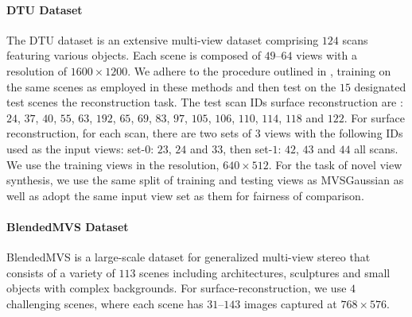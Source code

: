 \paragraph{\textbf{DTU Dataset}} The DTU dataset \cite{aanaes2016large} is an extensive multi-view dataset comprising $124$ scans featuring various objects. Each scene is composed of $49$–$64$ views with a resolution of $1600 \times 1200$. We adhere to the procedure outlined in \cite{long2022sparseneus, ren2023volrecon, liang2024retr}, training on the same scenes as employed in these methods and then test on the $15$ designated test scenes the reconstruction task. The test scan IDs surface reconstruction are : $24$, $37$, $40$, $55$, $63$, $192$, $65$, $69$, $83$, $97$, $105$, $106$, $110$, $114$, $118$ and $122$. For surface reconstruction, for each scan, there are two sets of 3 views with the following IDs used as the input views: set-$0$: $23$, $24$ and $33$, then set-$1$: $42$, $43$ and $44$ all scans. We use the training views in the resolution, \ie $640 \times 512$. For the task of novel view synthesis, we use the same split of training and testing views as MVSGaussian \cite{liu2024fast} as well as adopt the same input view set as them for fairness of comparison. 

\paragraph{\textbf{BlendedMVS Dataset}} BlendedMVS \cite{yao2020blendedmvs} is a large-scale dataset for generalized multi-view stereo that consists of a variety of $113$ scenes including architectures, sculptures and small objects with complex backgrounds. For surface-reconstruction, we use $4$ challenging scenes, where each scene has $31$–$143$ images captured at $768 \times 576$.